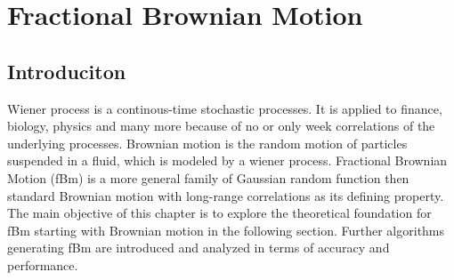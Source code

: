 \documentclass[
  a4paper,BCOR10mm,oneside,
  bibtotoc,idxtotoc,
  headsepline,footsepline,%
  fleqn,openbib
]{scrbook}
\begin{document}
\chapter{Fractional Brownian Motion}
\section{Introduciton}
Wiener process is a continous-time stochastic processes. It is applied to finance, biology, physics and many more because of no or only week correlations of the underlying processes. Brownian motion is the random motion of particles suspended in a fluid, which is modeled by a wiener process.   
Fractional Brownian Motion (fBm) is a more general family of Gaussian random function then standard Brownian motion with long-range correlations as its defining property. The main objective of this chapter is to explore the theoretical foundation for fBm starting with Brownian motion in the following section. Further algorithms generating fBm are introduced and analyzed in terms of accuracy and performance.    
\end{document}
